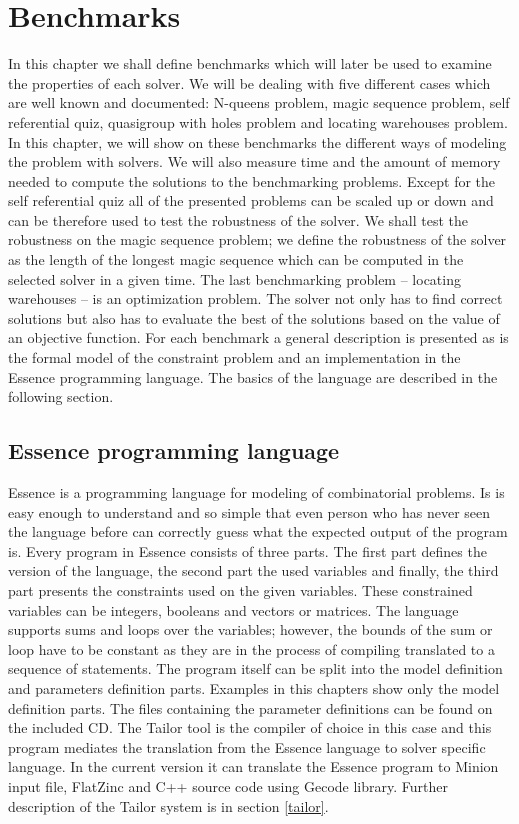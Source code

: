 \chapter{Benchmarks}
\label{benchmarks}

In this chapter we shall define benchmarks which will later be used to examine the properties of each solver. We will be dealing with five different cases which are well known and documented: N-queens problem, magic sequence problem, self referential quiz, quasigroup with holes problem and locating warehouses problem. In this chapter, we will show on these benchmarks the different ways of modeling the problem with solvers.
We will also measure time and the amount of memory needed to compute the solutions to the benchmarking 
problems. Except for the self referential quiz all of the presented problems can be scaled up or down
and can be therefore used to test the robustness of the solver. We shall test the robustness on the 
magic sequence problem; we define the robustness of the solver as the length of
the longest magic sequence which can be computed in the selected solver in a given 
time. The last benchmarking problem -- locating warehouses -- is an optimization
problem. The solver not only has to find correct solutions but also has to evaluate the best of the
solutions based on the value of an objective function. For each benchmark 
a general description is presented as is the formal model of the constraint problem and an implementation in
the Essence  programming language. The basics of the language are described in the following 
section.

\section{Essence programming language}
Essence is a programming language for modeling of combinatorial problems. Is is 
easy enough to understand and so simple that even person who has never seen the
language before can correctly guess what the expected output of the program is. Every program in Essence 
consists of three parts. The first part defines the version of the language, the second
part the used variables and finally, the third part presents the constraints used on the given 
variables. These constrained variables can be integers, booleans and vectors or matrices.
The language supports sums and loops over the variables; however, the bounds of the
sum or loop have to be constant as they are in the process of compiling translated
to a sequence of statements. The program itself can be split into the model definition
and parameters definition parts. Examples in this chapters show only the model 
definition parts. The files containing the parameter definitions can be found on the included CD.
The Tailor tool is the compiler of choice in this case and this program mediates the translation from the Essence language to solver specific language. In the current version it can translate the Essence program to Minion 
input file, FlatZinc and C++ source code using Gecode library. Further description of
the Tailor system is in section \ref{tailor}.

